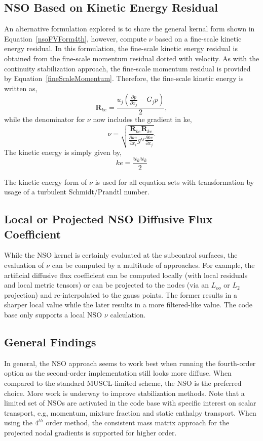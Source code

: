 \subsection{NSO Based on Kinetic Energy Residual}
An alternative formulation explored is to share the general kernal form shown in Equation~\ref{nsoFVForm4th},
however, compute $\nu$ based on a fine-scale kinetic energy residual. In this formulation, the fine-scale
kinetic energy residual is obtained from the fine-scale momentum residual dotted with velocity. As with the 
continuity stabilization approach, the fine-scale momentum residual is provided by Equation~\ref{fineScaleMomentum}.
Therefore, the fine-scale kinetic energy is written as,
\begin{equation}
 \mathbf{R}_{ke} = \frac{u_j(\frac{\partial p} {\partial x_j} - G_j p )}{2},
\label{fineScaleKe}
\end{equation}
while the denominator for $\nu$ now includes the gradient in ke,
\begin{equation}
  \nu = \sqrt{ \frac{\mathbf{R}_{ke} \mathbf{R}_{ke}} {\frac {\partial ke}{\partial x_i} g^{ij} \frac{\partial ke}{\partial x_j}} }.
\label{nuKe}
\end{equation}
The kinetic energy is simply given by,
\begin{equation}
  ke = \frac{u_k u_k}{2}
\label{keForm}
\end{equation}

The kinetic energy form of $\nu$ is used for all equation sets with transformation by usage of a 
turbulent Schmidt/Prandtl number.

\subsection{Local or Projected NSO Diffusive Flux Coefficient}
While the NSO kernel is certainly evaluated at the subcontrol surfaces, the evaluation of $\nu$ can be 
computed by a multitude of approaches. For example, the artificial diffusive flux coefficient 
can be computed locally (with local residuals and local metric tensors) or can be projected 
to the nodes (via an $L_{oo}$ or $L_2$ projection) and re-interpolated to the gauss points. 
The former results in a sharper local value while the later results in a more filtered-like value.
The code base only supports a local NSO $\nu$ calculation.

\subsection{General Findings}
In general, the NSO approach seems to work best when running the fourth-order option as the second-order 
implementation still looks more diffuse. When compared to the standard MUSCL-limited scheme, the NSO
is the preferred choice. More work is underway to improve stabilization methods.
Note that a limited set of NSOs are activated in the code base with specific
interest on scalar transport, e.g, momentum, mixture fraction and static enthalpy transport. 
When using the $4^{th}$  order method, the consistent mass matrix approach for the projected 
nodal gradients is supported for higher order.
